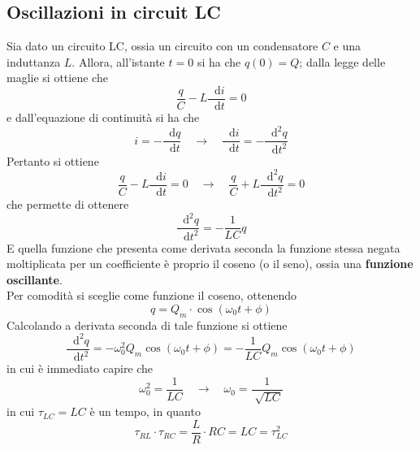 \documentclass[a4paper]{extarticle}
\newcommand\dif{\mathop{}\!\mathrm{d}}
\begin{document}
\subsection{Oscillazioni in circuit LC}
Sia dato un circuito LC, ossia un circuito con un condensatore $C$ e una induttanza $L$. Allora, all'istante $t=0$ si ha che $q(0)=Q$; dalla legge delle maglie si ottiene che
\[\dfrac{q}{C}-L \dfrac{\dif i}{\dif t} = 0\]
e dall'equazione di continuità si ha che
\[i=-\dfrac{\dif q}{\dif t} \hspace{1em} \rightarrow \hspace{1em} \dfrac{\dif i}{\dif t}=-\dfrac{\dif^2 q}{\dif t^2}\]
Pertanto si ottiene
\[\dfrac{q}{C} - L \dfrac{\dif i}{\dif t} = 0 \hspace{1em} \rightarrow \hspace{1em} \dfrac{q}{C} + L \dfrac{\dif^2 q}{\dif t^2} = 0\]
che permette di ottenere
\[\boxed{\dfrac{\dif^2 q}{\dif t^2} = - \dfrac{1}{LC} q}\]
E quella funzione che presenta come derivata seconda la funzione stessa negata moltiplicata per un coefficiente è proprio il coseno (o il seno), ossia una \textbf{funzione oscillante}.\\
Per comodità si sceglie come funzione il coseno, ottenendo
\[\boxed{q=Q_m \cdot \cos(\omega_0 t + \phi)}\]
Calcolando a derivata seconda di tale funzione si ottiene
\[\dfrac{\dif^2 q}{\dif t^2} = -\omega_0^2 Q_m \cos(\omega_0 t + \phi) = - \dfrac{1}{LC} Q_m \cos(\omega_0 t+\phi)\]
in cui è immediato capire che
\[\omega_0^2 = \dfrac{1}{LC} \hspace{1em} \rightarrow \hspace{1em} \omega_0=\dfrac{1}{\sqrt[]{LC}}\]
in cui $\tau_{LC}=LC$ è un tempo, in quanto
\[\tau_{RL} \cdot \tau_{RC} = \dfrac{L}{R} \cdot RC = LC = \tau_{LC}^2\]
\end{document}
